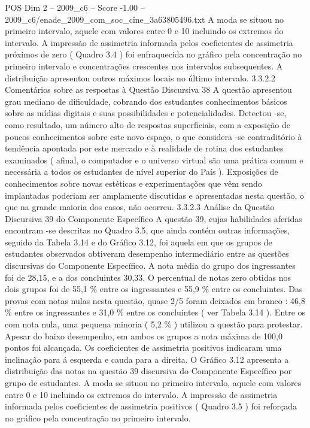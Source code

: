 \begin{textsample}{POS Dim 2 – 2009\_c6 – Score -1.00 – 2009\_c6/enade\_2009\_com\_soc\_cine\_3a63805496.txt}
A moda se situou no primeiro intervalo, aquele com valores entre 0 e 10 incluindo os extremos do intervalo.
A impressão de assimetria informada pelos coeficientes de assimetria próximos de zero ( Quadro 3.4 ) foi enfraquecida no gráfico pela concentração no primeiro intervalo e concentrações crescentes nos intervalos subsequentes.
A distribuição apresentou outros máximos locais no último intervalo. 3.3.2.2 Comentários sobre as respostas à Questão Discursiva 38 A questão apresentou grau mediano de dificuldade, cobrando dos estudantes conhecimentos básicos sobre as mídias digitais e suas possibilidades e potencialidades.
Detectou -se, como resultado, um número alto de respostas superficiais, com a exposição de poucos conhecimentos sobre este novo espaço, o que considera -se contraditório à tendência apontada por este mercado e à realidade de rotina dos estudantes examinados ( afinal, o computador e o universo virtual são uma prática comum e necessária a todos os estudantes de nível superior do País ).
Exposições de conhecimentos sobre novas estéticas e experimentações que vêm sendo implantadas poderiam ser amplamente discutidas e apresentadas nesta questão, o que na grande maioria dos casos, não ocorreu. 3.3.2.3 Análise da Questão Discursiva 39 do Componente Específico A questão 39, cujas habilidades aferidas encontram -se descritas no Quadro 3.5, que ainda contém outras informações, seguido da Tabela 3.14 e do Gráfico 3.12, foi aquela em que os grupos de estudantes observados obtiveram desempenho intermediário entre as questões discursivas do Componente Específico.
A nota média do grupo dos ingressantes foi de 28,15, e a dos concluintes 30,33.
O percentual de notas zero obtidas nos dois grupos foi de 55,1 \% entre os ingressantes e 55,9 \% entre os concluintes.
Das provas com notas nulas nesta questão, quase 2/5 foram deixados em branco : 46,8 \% entre os ingressantes e 31,0 \% entre os concluintes ( ver Tabela 3.14 ).
Entre os com nota nula, uma pequena minoria ( 5,2 \% ) utilizou a questão para protestar.
Apesar do baixo desempenho, em ambos os grupos a nota máxima de 100,0 pontos foi alcançada.
Os coeficientes de assimetria positivos indicaram uma inclinação para á esquerda e cauda para a direita.
O Gráfico 3.12 apresenta a distribuição das notas na questão 39 discursiva do Componente Específico por grupo de estudantes.
A moda se situou no primeiro intervalo, aquele com valores entre 0 e 10 incluindo os extremos do intervalo.
A impressão de assimetria informada pelos coeficientes de assimetria positivos ( Quadro 3.5 ) foi reforçada no gráfico pela concentração no primeiro intervalo.

\end{textsample}
